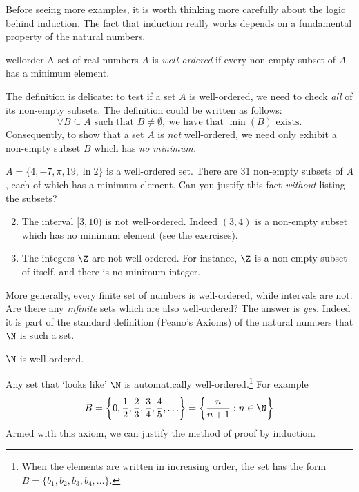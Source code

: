 Before seeing more examples, it is worth thinking more carefully about the logic behind induction. The fact that induction really works depends on a fundamental property of the natural numbers.

\begin{defn}{}{wellorder}
	A set of real numbers $A$ is \emph{well-ordered} if every non-empty subset of $A$ has a minimum element.
\end{defn}

The definition is delicate: to test if a set $A$ is well-ordered, we need to check \emph{all} of its non-empty subsets. The definition could be written as follows:
\[
	\forall B\subseteq A\text{ such that }B\neq\emptyset,\ \text{we have that $\min(B)$ exists.}
\]
Consequently, to show that a set $A$ is \emph{not} well-ordered, we need only exhibit a non-empty subset $B$ which has \emph{no minimum.}

\begin{examples}{}{}
	\exstart $A=\{4,-7,\pi,19,\ln 2\}$ is a well-ordered set. There are 31 non-empty subsets of $A$, each of which has a minimum element. Can you justify this fact \emph{without} listing the subsets?
	\begin{enumerate}\setcounter{enumi}{1}
	  \item The interval $[3,10)$ is not well-ordered. Indeed $(3,4)$ is a non-empty subset which has no minimum element (see the exercises).
	  \item The integers $\Z$ are not well-ordered. For instance, $\Z$ is a non-empty subset of itself, and there is no minimum integer.
	\end{enumerate}
\end{examples}

More generally, every finite set of numbers is well-ordered, while intervals are not. Are there any \emph{infinite} sets which are also well-ordered? The answer is \emph{yes.} Indeed it is part of the standard definition (Peano's Axioms) of the natural numbers that $\N$ is such a set.

\begin{axiom}{}{}
	$\N$ is well-ordered.
\end{axiom}

Any set that `looks like' $\N$ is automatically well-ordered.\footnote{When the elements are written in increasing order, the set has the form $B=\{b_1,b_2,b_3,b_4,\ldots\}$.} For example
\[
	B=\left\{0,\frac 12,\frac 23,\frac 34,\frac 45,\ldots\right\}=\left\{\frac n{n+1}:n\in\N\right\}
\]
Armed with this axiom, we can justify the method of proof by induction. 

